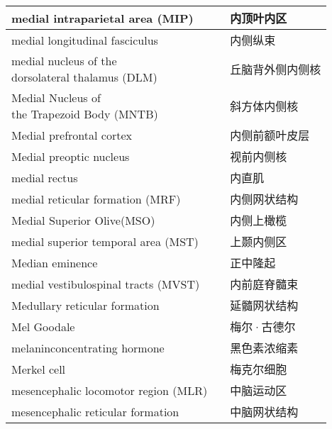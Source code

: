 \begin{longtable}{lll}
	\midrule
	medial intraparietal area (MIP)   && 内顶叶内区  \\
	
	\midrule
	medial longitudinal fasciculus   && 内侧纵束  \\
	
	\midrule
	\makecell{medial nucleus of the\\ dorsolateral thalamus (DLM)}  && 丘脑背外侧内侧核  \\
	
	\midrule
	\makecell{Medial Nucleus of \\the Trapezoid Body (MNTB)}   && 斜方体内侧核  \\
	
	\midrule
	Medial prefrontal cortex    && 内侧前额叶皮层  \\
	
	\midrule
	Medial preoptic nucleus    && 视前内侧核  \\
	
	\midrule
	medial rectus    && 内直肌  \\
	
	\midrule
	medial reticular formation (MRF)    && 内侧网状结构  \\
	
	\midrule
	Medial Superior Olive(MSO)   && 内侧上橄榄  \\
	
	\midrule
	medial superior temporal area (MST)   && 上颞内侧区  \\
	
	\midrule
	Median eminence   && 正中隆起  \\
	
	\midrule
	medial vestibulospinal tracts (MVST) && 内前庭脊髓束  \\
	
	\midrule
	Medullary reticular formation && 延髓网状结构  \\
	
	\midrule
	Mel Goodale && 梅尔·古德尔  \\
	
	\midrule
	melaninconcentrating hormone && 黑色素浓缩素  \\
	
	\midrule
	Merkel cell && 梅克尔细胞  \\
	
	\midrule
	mesencephalic locomotor region (MLR)   && 中脑运动区  \\
	
	\midrule
	mesencephalic reticular formation   && 中脑网状结构  \\
	

\end{longtable}
